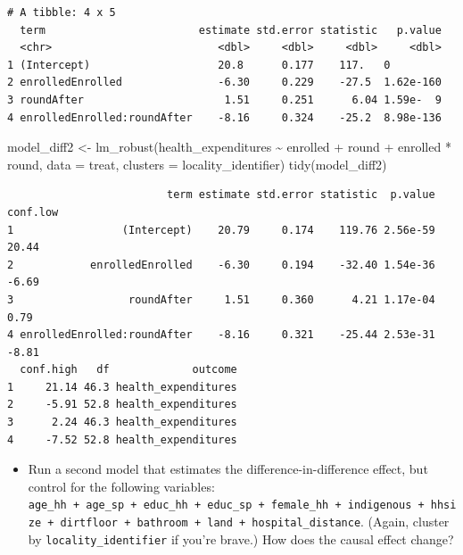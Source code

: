 \documentclass[
  letterpaper,
  DIV=11,
  numbers=noendperiod]{scrartcl}
\newenvironment{Shaded}{\begin{snugshade}}{\end{snugshade}}
\newcommand{\AttributeTok}[1]{\textcolor[rgb]{0.40,0.45,0.13}{#1}}
\newcommand{\FunctionTok}[1]{\textcolor[rgb]{0.28,0.35,0.67}{#1}}
\newcommand{\NormalTok}[1]{\textcolor[rgb]{0.00,0.23,0.31}{#1}}
\newcommand{\OtherTok}[1]{\textcolor[rgb]{0.00,0.23,0.31}{#1}}
\newcommand{\SpecialCharTok}[1]{\textcolor[rgb]{0.37,0.37,0.37}{#1}}
\providecommand{\tightlist}{%
  \setlength{\itemsep}{0pt}\setlength{\parskip}{0pt}}\usepackage{longtable,booktabs,array}
\begin{document}
\begin{verbatim}
# A tibble: 4 x 5
  term                        estimate std.error statistic   p.value
  <chr>                          <dbl>     <dbl>     <dbl>     <dbl>
1 (Intercept)                    20.8      0.177    117.   0        
2 enrolledEnrolled               -6.30     0.229    -27.5  1.62e-160
3 roundAfter                      1.51     0.251      6.04 1.59e-  9
4 enrolledEnrolled:roundAfter    -8.16     0.324    -25.2  8.98e-136
\end{verbatim}

\begin{Shaded}
\begin{Highlighting}[numbers=left,,]
\NormalTok{model\_diff2 }\OtherTok{\textless{}{-}} \FunctionTok{lm\_robust}\NormalTok{(health\_expenditures }\SpecialCharTok{\textasciitilde{}}\NormalTok{ enrolled }\SpecialCharTok{+}\NormalTok{ round }\SpecialCharTok{+}\NormalTok{ enrolled }\SpecialCharTok{*}\NormalTok{ round,}
                         \AttributeTok{data =}\NormalTok{ treat,}
                         \AttributeTok{clusters =}\NormalTok{ locality\_identifier)}
\FunctionTok{tidy}\NormalTok{(model\_diff2)}
\end{Highlighting}
\end{Shaded}

\begin{verbatim}
                         term estimate std.error statistic  p.value conf.low
1                 (Intercept)    20.79     0.174    119.76 2.56e-59    20.44
2            enrolledEnrolled    -6.30     0.194    -32.40 1.54e-36    -6.69
3                  roundAfter     1.51     0.360      4.21 1.17e-04     0.79
4 enrolledEnrolled:roundAfter    -8.16     0.321    -25.44 2.53e-31    -8.81
  conf.high   df             outcome
1     21.14 46.3 health_expenditures
2     -5.91 52.8 health_expenditures
3      2.24 46.3 health_expenditures
4     -7.52 52.8 health_expenditures
\end{verbatim}

\begin{itemize}
\tightlist
\item
  Run a second model that estimates the difference-in-difference effect,
  but control for the following variables:
  \texttt{age\_hh\ +\ age\_sp\ +\ educ\_hh\ +\ educ\_sp\ +\ female\_hh\ +\ indigenous\ +\ hhsize\ +\ dirtfloor\ +\ bathroom\ +\ land\ +\ hospital\_distance}.
  (Again, cluster by \texttt{locality\_identifier} if you're brave.) How
  does the causal effect change?
\end{itemize}
\end{document}
